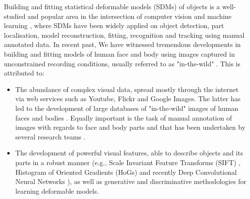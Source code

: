 Building and fitting statistical deformable models (SDMs) of objects is a well-studied and popular area in the intersection of computer vision and machine learning \cite{Cootes1995, Cootes2001, Matthews2004, Saragih2011, Belhumeur2011, Zhu2012, Xiong2013}, where SDMs have been widely applied on object detection, part localisation, model reconstruction, fitting, recognition and tracking using manual annotated data. In recent past, We have witnessed tremendous developments in building and fitting models of human face and body using images captured in unconstrained recording conditions, usually referred to as "in-the-wild" \cite{Belhumeur2011, Cao2012, Zhu2012, Xiong2013, Asthana2013, Tzimiropoulos2014, Asthana2014}. This is attributed to: 
\begin{itemize}

\item The abundance of complex visual data, spread mostly through the internet via web services such as Youtube, Flickr and Google Images. The latter has led to the development of large databases of "in-the-wild" images of human faces and bodies \cite{Belhumeur2011, Le2012, Zhu2012, Burgos2013}. Equally important is the task of manual annotation of images with regards to face and body parts and that has been undertaken by several research teams \cite{sagonas_iccv_300w_2013}.

\item The development of powerful visual features, able to describe objects and its parts in a robust manner (e.g., Scale Invariant Feature Transforms (SIFT) \cite{lowe1999object}, Histogram of Oriented Gradients (HoGs) \cite{Dalal2005} and recently Deep Convolutional Neural Networks \cite{sermanet2013overfeat}), as well as generative and discriminative methodologies for learning deformable models. 

\end{itemize}

